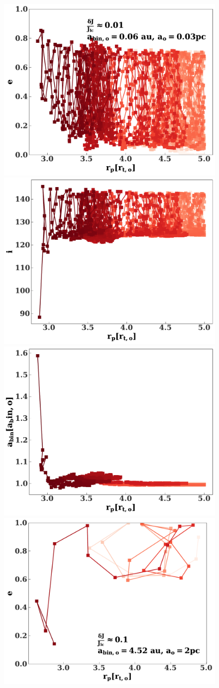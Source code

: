 \documentclass[fleqn,usenatbib]{mnras}
\begin{document}
\begin{figure}
    \includegraphics[width=0.66\columnwidth]{figures/esph_example_0.01.pdf}
    \includegraphics[width=0.66\columnwidth]{figures/isph_example_0.01.pdf}
    \includegraphics[width=0.66\columnwidth]{figures/asph_example_0.01.pdf}
    \includegraphics[width=0.66\columnwidth]{figures/esph_example_0.1.pdf}

\end{figure}
\end{document}
